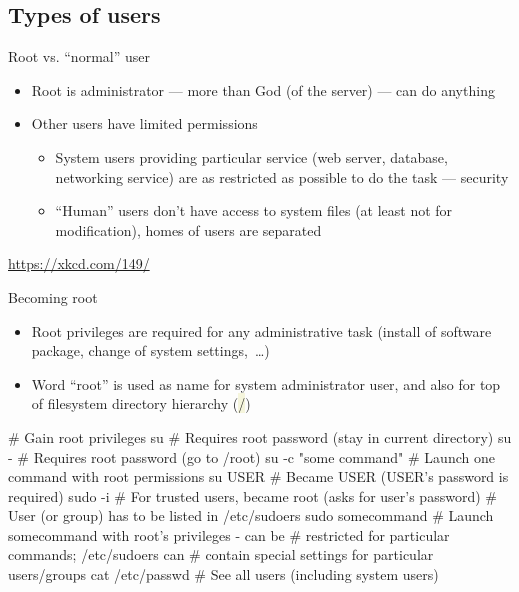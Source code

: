 \documentclass[compress, xelatex, 11pt, xcolor=svgnames, aspectratio=169,
	hyperref={
		bookmarks=true,
		unicode=true,
		colorlinks=true,
		pdftitle={Linux, command line and MetaCentrum},
		plainpages=false,
		pdfauthor={Vojtech Zeisek},
		pdfsubject={Course about use of Linux command line, writing shell scripts and using MetaCentrum of CESNET},
		pdfcreator={XeLaTeX},
		pdfkeywords={Linux, GNU, BASH, shell, command line, MetaCentrum},
		linkcolor=DarkRed, %
		anchorcolor=DarkBlue, %
		citecolor=Indigo, %
		filecolor=NavyBlue, %
		menucolor=DarkMagenta, %
		urlcolor=DarkBlue, %
		},
	url={hyphens, lowtilde} %
	]{beamer}
\renewcommand{\texttt}[1]{\colorbox{Beige}{{\ttfamily #1}}}
\begin{document}
\subsection{Types of users}

\begin{frame}{Root vs. \enquote{normal} user}
	\label{root}
	\begin{itemize}
		\item Root is administrator --- more than God (of the server) --- can do anything
		\item Other users have limited permissions
		\begin{itemize}
			\item System users providing particular service (web server, database, networking service) are as restricted as possible to do the task --- security
			\item \enquote{Human} users don't have access to system files (at least not for modification), homes of users are separated
		\end{itemize}
	\end{itemize}
	\begin{center}
		\texttt{[image: sandwich.png]}
	\end{center}
	\begin{flushright}
		\url{https://xkcd.com/149/}
	\end{flushright}
\end{frame}

\begin{frame}[fragile]{Becoming root}
	\begin{itemize}
		\item Root privileges are required for any administrative task (install of software package, change of system settings,~\ldots)
		\item Word \enquote{root} is used as name for system administrator user, and also for top of filesystem directory hierarchy (\texttt{/})
	\end{itemize}
	\begin{bashcode}
    # Gain root privileges
    su # Requires root password (stay in current directory)
    su - # Requires root password (go to /root)
    su -c "some command" # Launch one command with root permissions
    su USER # Became USER (USER's password is required)
    sudo -i # For trusted users, became root (asks for user's password)
            # User (or group) has to be listed in /etc/sudoers
    sudo somecommand # Launch somecommand with root's privileges - can be
                     # restricted for particular commands; /etc/sudoers can
                     # contain special settings for particular users/groups
    cat /etc/passwd # See all users (including system users)
	\end{bashcode}
\end{frame}
\end{document}
